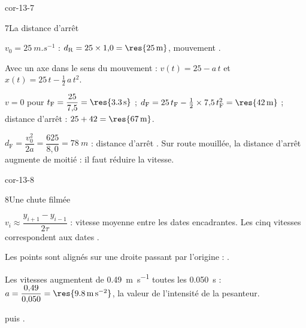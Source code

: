 \begin{blocLivre}{cor-13-7}
\begin{corrige}{7}{La distance d'arrêt}
\begin{questions}
\item $v_0=\qty{25}{m.s^{-1}}$ : $d_\mathrm{R}=25\times1{,}0=\res{\qty{25}{m}}$, mouvement .
\item Avec un axe dans le sens du mouvement : $v(t)=25-a\,t$ et $x(t)=25\,t-\frac12\,a\,t^2$.
\item $v=0$ pour $t_\mathrm{F}=\dfrac{25}{7{,}5}=\res{\qty{3,3}{s}}$ ; $d_\mathrm{F}=25\,t_\mathrm{F}-\frac12\times7{,}5\,t_\mathrm{F}^2=\res{\qty{42}{m}}$ ;
distance d'arrêt : $25+42=\res{\qty{67}{m}}$.
\item $d_\mathrm{F}=\dfrac{v_0^2}{2a}=\dfrac{625}{8{,}0}=\qty{78}{m}$ : distance d'arrêt . Sur route mouillée,
la distance d'arrêt augmente de moitié : il faut réduire la vitesse.
\end{questions}
\end{corrige}
\end{blocLivre}
\begin{blocLivre}{cor-13-8}
\begin{corrige}{8}{Une chute filmée}
\begin{questions}
\item $v_i\approx\dfrac{y_{i+1}-y_{i-1}}{2\tau}$ : vitesse moyenne entre les dates encadrantes. Les cinq vitesses
correspondent aux dates .
\item Les points sont alignés sur une droite passant par l'origine : .
\item Les vitesses augmentent de \qty{0,49}{m.s^{-1}} toutes les \qty{0,050}{s} :
$a=\dfrac{0{,}49}{0{,}050}=\res{\qty{9,8}{m.s^{-2}}}$, la valeur de l'intensité de la pesanteur.
\item {} puis .
\end{questions}
\end{corrige}
\end{blocLivre}
